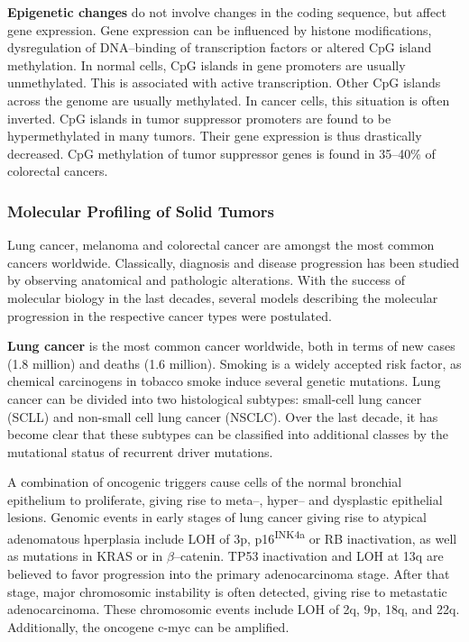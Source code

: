     \textbf{Epigenetic changes} do not involve changes in the coding sequence,
    but affect gene expression. Gene expression can be influenced by histone
    modifications, dysregulation of DNA--binding of transcription factors or
    altered CpG island methylation. In normal cells, CpG islands in gene
    promoters are usually unmethylated. This is associated with active
    transcription. Other CpG islands across the genome are usually methylated.
    In cancer cells, this situation is often inverted. CpG islands in tumor
    suppressor promoters are found to be hypermethylated in many tumors. Their
    gene expression is thus drastically decreased. CpG methylation of tumor
    suppressor genes is found in 35--40\%  of colorectal cancers.


    \subsubsection{Molecular Profiling of Solid Tumors}

    Lung cancer, melanoma and colorectal cancer are amongst the most common
    cancers worldwide. Classically, diagnosis and disease progression has been
    studied by observing anatomical and pathologic alterations. With the success
    of molecular biology in the last decades, several models describing the
    molecular progression in the respective cancer types were postulated.

    \textbf{Lung cancer} is the most common cancer worldwide, both in terms of
    new cases (1.8 million) and deaths (1.6 million). Smoking is a widely
    accepted risk factor, as chemical carcinogens in tobacco smoke induce
    several genetic mutations. Lung cancer can be divided
    into two histological subtypes: small-cell lung cancer (SCLL) and non-small
    cell lung cancer (NSCLC). Over the last decade, it has become clear that
    these subtypes can be classified into  additional classes by the mutational
    status of recurrent driver mutations.

    A combination of oncogenic triggers cause cells of the normal bronchial
    epithelium to proliferate, giving rise to meta--, hyper-- and dysplastic
    epithelial lesions. Genomic events in early stages of lung cancer giving
    rise to atypical adenomatous hperplasia include LOH of 3p,
    p16\textsuperscript{INK4a} or RB inactivation, as well as
    mutations in KRAS or in $\beta$--catenin. TP53
    inactivation and LOH at 13q are believed to favor progression into
    the primary adenocarcinoma stage. After that stage, major chromosomic
    instability is often detected, giving rise to metastatic adenocarcinoma.
    These chromosomic events include LOH of 2q, 9p, 18q,
    and 22q. Additionally, the oncogene c-myc can be amplified.

